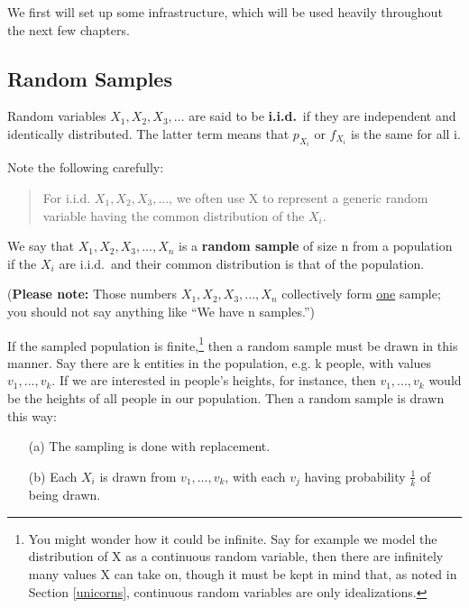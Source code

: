 We first will set up some infrastructure, which will be used heavily
throughout the next few chapters.

\subsection{Random Samples}
\label{randomsamples}

\begin{definition}
Random variables $X_1, X_2, X_3,...$ are said to be
{\bf i.i.d.}\ if they are independent and identically distributed.  The
latter term means that $p_{X_i}$ or $f_{X_i}$ is the same for all i.
\end{definition}

Note the following carefully:

\begin{quote}
For i.i.d. $X_1, X_2, X_3,...$, we often use X to represent a generic
random variable having the common distribution of the $X_i$.
\end{quote}

\begin{definition}
We say that $X_1, X_2, X_3,...,X_n$ is a {\bf random
sample} of size n from a population if the $X_i$ are i.i.d.\ and their 
common distribution is that of the population.
\end{definition}

({\bf Please note:}  Those numbers $X_1, X_2, X_3,...,X_n$ collectively
form \underline{one} sample; you should not say anything like ``We have
n samples.'')

If the sampled population is finite,\footnote{You might wonder how it
could be infinite.  Say for example we model the distribution of X as a
continuous random variable, then there are infinitely many values X can
take on, though it must be kept in mind that, as noted in Section
\ref{unicorns}, continuous random variables are only idealizations.}
then a random sample must be drawn in this manner.  Say there are k
entities in the population, e.g. k people, with values $v_1,...,v_k$.  
If we are interested in people's heights, for instance, then
$v_1,...,v_k$ would be the heights of all people in our population.
Then a random sample is drawn this way:

\begin{itemize}

\item [(a)] The sampling is done with replacement.

\item [(b)] Each $X_i$ is drawn from $v_1,...,v_k$, with each $v_j$
having probability $\frac{1}{k}$ of being drawn.

\end{itemize}

